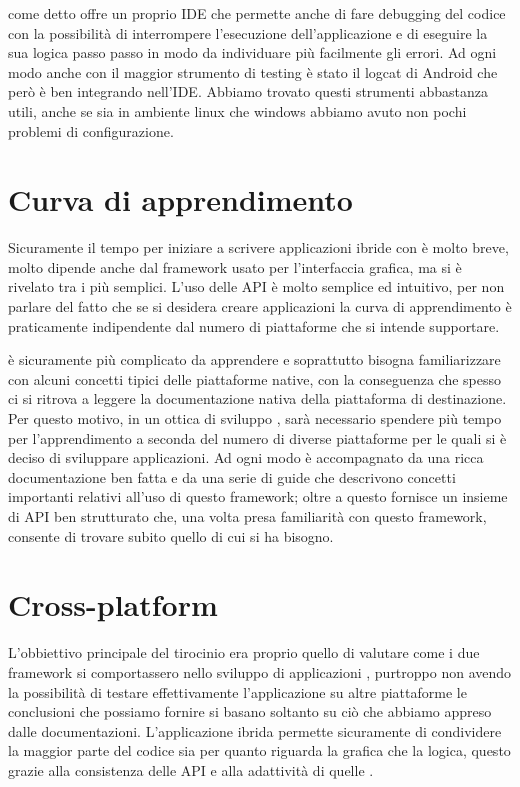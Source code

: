     \tisdk{} come detto offre un proprio IDE che permette anche di fare
    debugging del codice \js{} con la possibilità di interrompere
    l'esecuzione dell'applicazione e di eseguire la sua logica passo passo
    in modo da individuare più facilmente gli errori. Ad ogni modo anche
    con \tisdk{} il maggior strumento di testing è stato il logcat di
    Android che però è ben integrando nell'IDE. Abbiamo trovato
    questi strumenti abbastanza utili, anche se sia in ambiente linux che
    windows abbiamo avuto non pochi problemi di configurazione.


    \section{Curva di apprendimento}
    Sicuramente il tempo per iniziare a scrivere applicazioni ibride con
    \pg{} è molto breve, molto dipende anche dal frame\-work usato per
    l'interfaccia grafica, ma \kendomob{} si è rivelato tra i più semplici.
    L'uso delle API è molto semplice ed intuitivo, per non parlare del
    fatto che se si desidera creare applicazioni \crossplat{} la curva di
    apprendimento è praticamente indipendente dal numero di piattaforme
    che si intende supportare.

    \tisdk{} è sicuramente più complicato da apprendere e soprattutto
    bisogna familiarizzare con alcuni concetti tipici delle piattaforme
    native, con la conseguenza che spesso ci si ritrova a leggere la
    documentazione nativa della piattaforma di destinazione. Per
    questo motivo, in un ottica di sviluppo \crossplat{}, sarà necessario
    spendere più tempo per l'apprendimento a seconda del numero di diverse
    piattaforme per le quali si è deciso di sviluppare applicazioni. Ad
    ogni modo \tisdk{} è accompagnato da una ricca documentazione ben
    fatta e da una serie di guide che descrivono concetti
    importanti relativi all'uso di questo frame\-work; oltre a questo
    \tisdk{} fornisce un insieme di API ben strutturato che, una volta
    presa familiarità con questo frame\-work, consente di trovare subito
    quello di cui si ha bisogno.


    \section{Cross-platform}
    L'obbiettivo principale del tirocinio era proprio quello di valutare
    come i due frame\-work si comportassero nello sviluppo di applicazioni
    \crossplat{}, purtroppo non avendo la possibilità di testare
    effettivamente l'applicazione su altre piattaforme le conclusioni che
    possiamo fornire si basano soltanto su ciò che abbiamo appreso dalle
    documentazioni. L'applicazione ibrida permette sicuramente di
    condividere la maggior parte del codice sia per quanto riguarda la
    grafica che la logica, questo grazie alla consistenza delle API \pg{}
    e alla adattività di quelle \kendomob{}.

